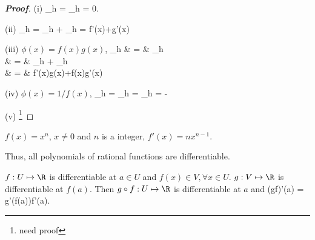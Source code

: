 \begin{proof}[{\bf Proof}] \ben
\item [(i)]
\be
\lim_{h} = \lim_{h} = 0.
\ee

\item [(ii)]
\be
\lim_{h} =  \lim_{h} + \lim_{h} =  f'(x)+g'(x)
\ee

\item [(iii)] $\phi(x)=f(x)g(x)$,
\bea
\lim_{h} & = & \lim_{h} \nonumber\\
& = & \lim_{h} + \lim_{h} \nonumber\\
& = & f'(x)g(x)+f(x)g'(x) 
\eea

\item [(iv)] $\phi(x)=1/f(x)$,
\be
\lim_{h} = \lim_{h} = \lim_{h} = -
\ee
\item [(v)] \footnote{need proof}
\een
\end{proof}

\begin{example}
$f(x)=x^n$, $x\neq 0$ and $n$ is a integer, $f'(x) = nx^{n-1}$. 

Thus, all polynomials of rational functions are differentiable.
\end{example}

\begin{theorem}\label{thm:chain_rule_real_function}
$f: U\mapsto \R$ is differentiable at $a\in U$ and $f(x)\in V, \forall x\in U$. $g: V\mapsto \R$ is differentiable at $f(a)$. Then $g\circ f: U\mapsto \R$ is differentiable at $a$ and 
\be
(g\circ f)'(a) = g'(f(a))f'(a).
\ee
\end{theorem}

